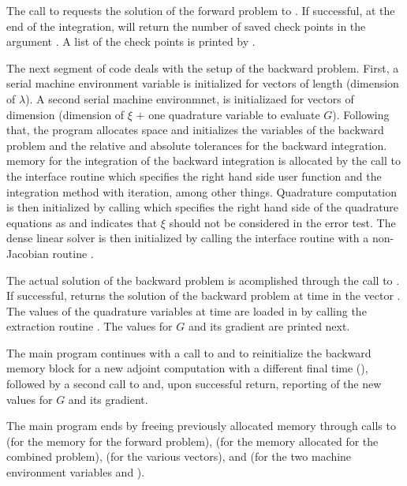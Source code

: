 The call to  requests the solution of the forward problem to .
If successful, at the end of the integration,  will return the number
of saved check points in the argument . A list of the check points
is printed by .

The next segment of code deals with the setup of the backward problem. First,
a serial machine environment variable  is initialized for vectors
of length  (dimension of $\lambda$). A second serial
machine environmnet,  is initializaed for vectors of
dimension  (dimension of $\xi$ $+$ one quadrature variable to evaluate $G$).
Following that, the program allocates space and initializes the variables of the 
backward problem and the relative and absolute tolerances for the backward integration.
{\cvodes} memory for the integration of the backward integration is allocated
by the call to the interface routine  which specifies the
right hand side user function  and the 
integration method with  iteration, among other things.
Quadrature computation is then initialized by calling 
which specifies the right hand side of the quadrature equations as 
and indicates that $\xi$ should not be considered in the error test.
The dense linear solver {\cvdense} is then initialized by calling the 
interface routine with a non- Jacobian routine .

The actual solution of the backward problem is acomplished through the call to
. If successful,  returns the solution of the backward 
problem at time  in the vector . The values of the quadrature
variables at time  are loaded in  by calling the extraction
routine . The values for $G$ and its gradient are printed next.

The main program continues with a call to  and
 to reinitialize the 
backward memory block for a new adjoint computation with a different final 
time (), followed by a second call to  and, upon successful
return, reporting of the new values for $G$ and its gradient.

The main program ends by freeing previously allocated memory through calls to 
 (for the {\cvodes} memory for the forward problem),  
(for the memory allocated for the combined problem),  
(for the various vectors), and  (for the two machine 
environment variables  and ).

